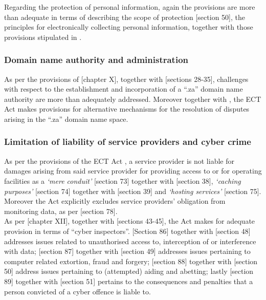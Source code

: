 \documentclass[11pt]{article}
\begin{document}
Regarding the protection of personal information, again the provisions are more
than adequate in terms of describing the scope of protection [section
50]\cite{rsa02_elect_comm_trans_act}, the principles for electronically collecting
personal information, together with those provisions stipulated in
\cite{rsa13_popi}.

\subsubsection{Domain name authority and administration}
\label{sec:org241f046}
As per the provisions of [chapter X]\cite{rsa02_elect_comm_trans_act}, together
with [sections 28-35]\cite{rsa12_elect_comm_trans_amend_bill}, challenges with
respect to the establishment and incorporation of a ``.za'' domain name
authority are more than adequately addressed. Moreover together with
\cite{rsa12_ect_adr}, the ECT Act \cite{rsa02_elect_comm_trans_act} makes provisions
for alternative mechanisms for the resolution of disputes arising in the ``.za''
domain name space.

\subsubsection{Limitation of liability of service providers and cyber crime}
\label{sec:org6364631}
As per the provisions of the ECT Act \cite{rsa02_elect_comm_trans_act}, a service
provider is not liable for damages arising from said service provider for
providing access to or for operating facilities as a \emph{`mere conduit'} [section
73]\cite{rsa02_elect_comm_trans_act} together with [section
38]\cite{rsa12_elect_comm_trans_amend_bill}, \emph{`caching purposes'} [section
74]\cite{rsa02_elect_comm_trans_act} together with [section
39]\cite{rsa12_elect_comm_trans_amend_bill} and \emph{`hosting services'} [section
75]\cite{rsa02_elect_comm_trans_act}. Moreover the Act explicitly excludes service
providers' obligation from monitoring data, as per [section
78]\cite{rsa02_elect_comm_trans_act}.\\

As per [chapter XII]\cite{rsa02_elect_comm_trans_act}, together with [sections
43-45]\cite{rsa12_elect_comm_trans_amend_bill}, the Act makes for adequate
provision in terms of ``cyber inspectors''. [Section
86]\cite{rsa02_elect_comm_trans_act} together with [section
48]\cite{rsa12_elect_comm_trans_amend_bill} addresses issues related to
unauthorised access to, interception of or interference with data; [section
87]\cite{rsa02_elect_comm_trans_act} together with [section
49]\cite{rsa12_elect_comm_trans_amend_bill} addresses issues pertaining to
computer related extortion, fraud and forgery; [section
88]\cite{rsa02_elect_comm_trans_act} together with [section
50]\cite{rsa12_elect_comm_trans_amend_bill} address issues pertaining to
(attempted) aiding and abetting; lastly [section
89]\cite{rsa02_elect_comm_trans_act} together with [section
51]\cite{rsa12_elect_comm_trans_amend_bill} pertains to the consequences and
penalties that a person convicted of a cyber offence is liable to.
\end{document}
